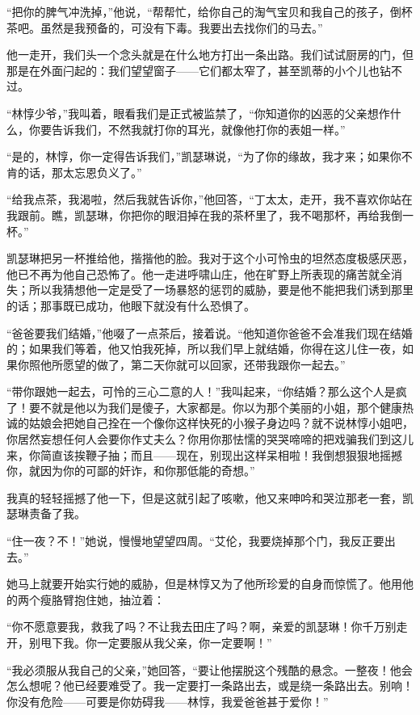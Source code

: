 \par “把你的脾气冲洗掉，”他说，“帮帮忙，给你自己的淘气宝贝和我自己的孩子，倒杯茶吧。虽然是我预备的，可没有下毒。我要出去找你们的马去。”
\par 他一走开，我们头一个念头就是在什么地方打出一条出路。我们试试厨房的门，但那是在外面闩起的：我们望望窗子——它们都太窄了，甚至凯蒂的小个儿也钻不过。
\par “林惇少爷，”我叫着，眼看我们是正式被监禁了，“你知道你的凶恶的父亲想作什么，你要告诉我们，不然我就打你的耳光，就像他打你的表姐一样。”
\par “是的，林惇，你一定得告诉我们，”凯瑟琳说，“为了你的缘故，我才来；如果你不肯的话，那太忘恩负义了。”
\par “给我点茶，我渴啦，然后我就告诉你，”他回答，“丁太太，走开，我不喜欢你站在我跟前。瞧，凯瑟琳，你把你的眼泪掉在我的茶杯里了，我不喝那杯，再给我倒一杯。”
\par 凯瑟琳把另一杯推给他，揩揩他的脸。我对于这个小可怜虫的坦然态度极感厌恶，他已不再为他自己恐怖了。他一走进呼啸山庄，他在旷野上所表现的痛苦就全消失；所以我猜想他一定是受了一场暴怒的惩罚的威胁，要是他不能把我们诱到那里的话；那事既已成功，他眼下就没有什么恐惧了。
\par “爸爸要我们结婚，”他啜了一点茶后，接着说。“他知道你爸爸不会准我们现在结婚的；如果我们等着，他又怕我死掉，所以我们早上就结婚，你得在这儿住一夜，如果你照他所愿望的做了，第二天你就可以回家，还带我跟你一起去。”
\par “带你跟她一起去，可怜的三心二意的人！”我叫起来，“你结婚？那么这个人是疯了！要不就是他以为我们是傻子，大家都是。你以为那个美丽的小姐，那个健康热诚的姑娘会把她自己拴在一个像你这样快死的小猴子身边吗？就不说林惇小姐吧，你居然妄想任何人会要你作丈夫么？你用你那怯懦的哭哭啼啼的把戏骗我们到这儿来，你简直该挨鞭子抽；而且——现在，别现出这样呆相啦！我倒想狠狠地摇撼你，就因为你的可鄙的奸诈，和你那低能的奇想。”
\par 我真的轻轻摇撼了他一下，但是这就引起了咳嗽，他又来呻吟和哭泣那老一套，凯瑟琳责备了我。
\par “住一夜？不！”她说，慢慢地望望四周。“艾伦，我要烧掉那个门，我反正要出去。”
\par 她马上就要开始实行她的威胁，但是林惇又为了他所珍爱的自身而惊慌了。他用他的两个瘦胳臂抱住她，抽泣着：
\par “你不愿意要我，救我了吗？不让我去田庄了吗？啊，亲爱的凯瑟琳！你千万别走开，别甩下我。你一定要服从我父亲，你一定要啊！”
\par “我必须服从我自己的父亲，”她回答，“要让他摆脱这个残酷的悬念。一整夜！他会怎么想呢？他已经要难受了。我一定要打一条路出去，或是绕一条路出去。别响！你没有危险——可要是你妨碍我——林惇，我爱爸爸甚于爱你！”
